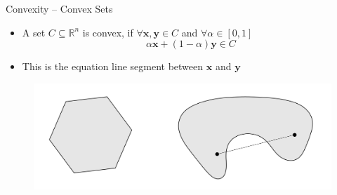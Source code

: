 \begin{frame}{Convexity -- Convex Sets}{}
	\begin{itemize}
		\item A set $C \subseteq \mathbb{R}^n$ is convex, if $\forall \bm{x}, \bm{y} \in C$ and $\forall \alpha \in [0,1]$
		\begin{equation}	
			\alpha \bm{x} + (1 - \alpha) \bm{y} \in C
		\end{equation}
		\item This is the equation line segment between $\bm{x}$ and $\bm{y}$
	\end{itemize}
	
	\vspace*{-3mm}
	\begin{figure}
		\center
		\includegraphics[scale=0.4]{02_math/02_img/convex_sets}
	\end{figure}
\end{frame}


